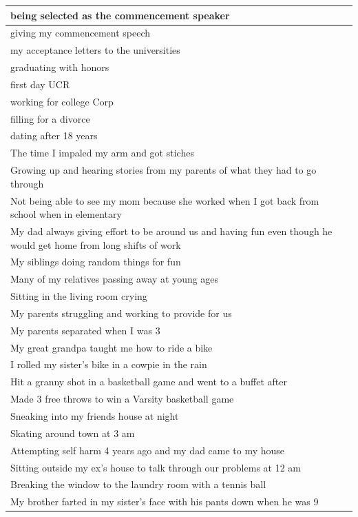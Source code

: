 \documentclass[
  .7em,
  letterpaper,
  DIV=11,
  numbers=noendperiod]{scrartcl}
\begin{document}
\begin{table}
\begin{tabular}{l}
\hline
being selected as the commencement speaker\\
\hline
giving my commencement speech\\
\hline
my acceptance letters to the universities\\
\hline
graduating with honors\\
\hline
first day UCR\\
\hline
working for college Corp\\
\hline
filling for a divorce\\
\hline
dating after 18 years\\
\hline
The time I impaled my arm and got stiches\\
\hline
Growing up and hearing stories from my parents of what they had to go through\\
\hline
Not being able to see my mom because she worked when I got back from school when in elementary\\
\hline
My dad always giving effort to be around us and having fun even though he would get home from long shifts of work\\
\hline
My siblings doing random things for fun\\
\hline
Many of my relatives passing away at young ages\\
\hline
Sitting in the living room crying\\
\hline
My parents struggling and working to provide for us\\
\hline
My parents separated when I was 3\\
\hline
My great grandpa taught me how to ride a bike\\
\hline
I rolled my sister's bike in a cowpie in the rain\\
\hline
Hit a granny shot in a basketball game and went to a buffet after\\
\hline
Made 3 free throws to win a Varsity basketball game\\
\hline
Sneaking into my friends house at night\\
\hline
Skating around town at 3 am\\
\hline
Attempting self harm 4 years ago and my dad came to my house\\
\hline
Sitting outside my ex's house to talk through our problems at 12 am\\
\hline
Breaking the window to the laundry room with a tennis ball\\
\hline
My brother farted in my sister's face with his pants down when he was 9\\

\end{tabular}
\end{table}
\end{document}
